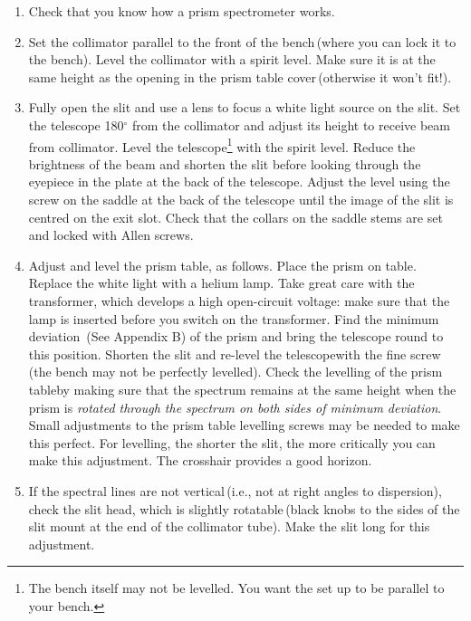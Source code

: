 \documentclass[12pt]{article}
\begin{document}
\begin{enumerate}
\item Check that you know how a prism spectrometer works.

\item Set the collimator parallel to the front of the bench\,(where you can lock it to the bench). Level the collimator with a spirit level. Make sure it is at the same height as the opening in the prism table cover\,(otherwise it won't fit!).

\item Fully open the slit and use a lens to focus a white light source on the slit. Set the telescope 180$^\circ$ from the collimator and adjust its height to receive beam from collimator. Level the telescope\footnote{\label{levelling} The bench itself may not be levelled. You want the set up to be parallel to your bench.} with the spirit level. Reduce the brightness of the beam and shorten the slit before looking through the eyepiece in the plate at the back of the telescope. Adjust the level using the screw on the saddle at the back of the telescope until the image of the slit is centred on the exit slot. Check that the collars on the saddle stems are set and locked with Allen screws.

\item Adjust and level the prism table, as follows. Place the prism on table. Replace the white light with a helium lamp. Take great care with the transformer, which develops a high open-circuit voltage: make sure that the lamp is inserted before you switch on the transformer. Find the minimum deviation~(See Appendix B) of the prism and bring the telescope round to this position. Shorten the slit and re-level the telescope\footnotemark[\ref{levelling}] with the fine screw\,(the bench may not be perfectly levelled). Check the levelling of the prism table\footnotemark[\ref{levelling}] by making sure that the spectrum remains at the same height when the prism is {\sl rotated through the spectrum on both sides of minimum deviation}. Small adjustments to the prism table levelling screws may be needed to make this perfect. For levelling, the shorter the slit, the more critically you can make this adjustment. The crosshair provides a good horizon. 

\item If the spectral lines are not vertical\,(i.e., not at right angles to dispersion), check the slit head, which is slightly rotatable\,(black knobs to the sides of the slit mount at the end of the collimator tube). Make the slit long for this adjustment.


\end{enumerate}
\end{document}
